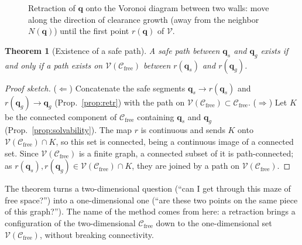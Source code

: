 \documentclass[11pt,a4paper]{article}
\newcommand{\Cfree}{\mathcal{C}_{\mathrm{free}}}
\newcommand{\Vor}{\mathcal{V}}
\newcommand{\vq}{\boldsymbol{q}}
\newcommand{\qs}{\boldsymbol{q}_s}
\newcommand{\qg}{\boldsymbol{q}_g}
\theoremstyle{definition}
\theoremstyle{plain}
\newtheorem{theorem}[definition]{Theorem}
\theoremstyle{remark}
\begin{document}
\begin{figure}[H]
\centering
{}
\caption{Retraction of $\vq$ onto the Voronoi diagram between two walls: move along the direction of clearance growth (away from the neighbor $N(\vq)$) until the first point $r(\vq)$ of $\Vor$.}
\label{fig:retraction}
\end{figure}

\begin{theorem}[Existence of a safe path]
\label{thm:retr}
A safe path between $\qs$ and $\qg$ exists if and only if a path exists on $\Vor(\Cfree)$ between $r(\qs)$ and $r(\qg)$.
\end{theorem}
\begin{proof}[Proof sketch]
($\Leftarrow$) Concatenate the safe segments $\qs\to r(\qs)$ and $r(\qg)\to\qg$ (Prop.~\ref{prop:retr}) with the path on $\Vor(\Cfree)\subset\Cfree$.
($\Rightarrow$) Let $K$ be the connected component of $\Cfree$ containing $\qs$ and $\qg$ (Prop.~\ref{prop:solvability}). The map $r$ is continuous and sends $K$ onto $\Vor(\Cfree)\cap K$, so this set is connected, being a continuous image of a connected set. Since $\Vor(\Cfree)$ is a finite graph, a connected subset of it is path-connected; as $r(\qs),r(\qg)\in\Vor(\Cfree)\cap K$, they are joined by a path on $\Vor(\Cfree)$.
\end{proof}

\begin{intuition}
The theorem turns a two-dimensional question (``can I get through this maze of free space?'') into a one-dimensional one (``are these two points on the same piece of this graph?''). The name of the method comes from here: a retraction brings a configuration of the two-dimensional $\Cfree$ down to the one-dimensional set $\Vor(\Cfree)$, without breaking connectivity.
\end{intuition}
\end{document}
